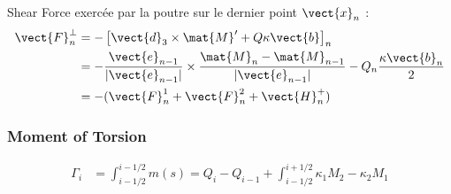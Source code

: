 Shear Force  exercée par la poutre sur le dernier point $\vect{x}_n$ :
\begin{equation}
	\begin{aligned}
	\vect{F}_n^{\perp}
	&= - \left[ \vect{d}_3 \times \mat{M}'+ Q\kappa\vect{b}\right]_{n} \\
	&= - \frac{\vect{e}_{n-1}}{|\vect{e}_{n-1}|} \times \frac{\mat{M}_{n} - \mat{M}_{n-1}}{|\vect{e}_{n-1}|}
	- Q_n\frac{\kappa\vect{b}_{n}}{2} \\
	& = -(\vect{F}^1_{n} + \vect{F}^2_{n}  +  \vect{H}^+_{n}) \\
	\end{aligned}
\end{equation}


\subsubsection{Moment of Torsion}

\begin{equation}
	\begin{aligned}
	\Gamma_i
		&= \int_{i-1/2}^{i-1/2} m(s)
		= Q_{i} - Q_{i-1}
		+ \int_{i-1/2}^{i+1/2} \kappa_{1} M_{2} - \kappa_{2} M_{1}\\
	\end{aligned}
\end{equation}

